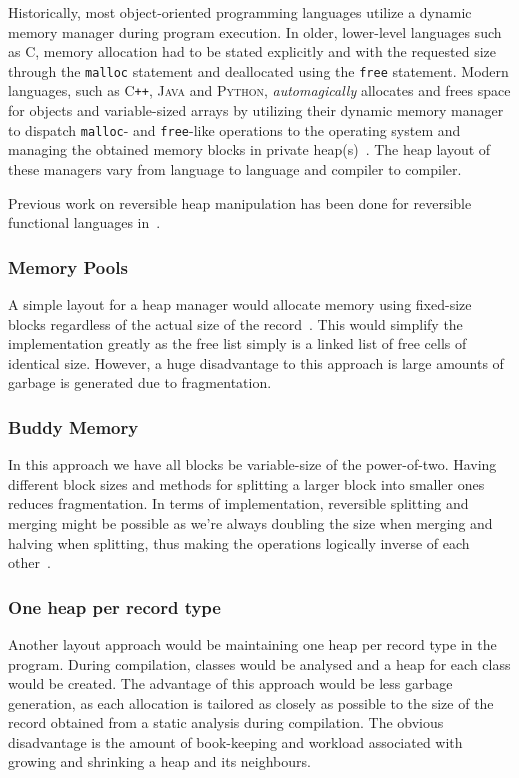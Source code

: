 Historically, most object-oriented programming languages utilize a dynamic memory manager during program execution. In older, lower-level languages such as \textsc{C}, memory allocation had to be stated explicitly and with the requested size through the \texttt{malloc} statement and deallocated using the \texttt{free} statement. Modern languages, such as \textsc{C\texttt{++}}, \textsc{Java} and \textsc{Python}, \textit{automagically} allocates and frees space for objects and variable-sized arrays by utilizing their dynamic memory manager to dispatch \texttt{malloc}- and \texttt{free}-like operations to the operating system and managing the obtained memory blocks in private heap(s)~\cite{wh:cpp_memory, bv:jvm, py:memory}. The heap layout of these managers vary from language to language and compiler to compiler.

Previous work on reversible heap manipulation has been done for reversible functional languages in~\cite{ha:heap, jsk:translation, tm:garbage}.

\subsubsection{Memory Pools}
A simple layout for a heap manager would allocate memory using fixed-size blocks regardless of the actual size of the record~\cite{bk:memorypool}. This would simplify the implementation greatly as the free list simply is a linked list of free cells of identical size. However, a huge disadvantage to this approach is large amounts of garbage is generated due to fragmentation.



\subsubsection{Buddy Memory}
In this approach we have all blocks be variable-size of the power-of-two. Having different block sizes and methods for splitting a larger block into smaller ones reduces fragmentation. In terms of implementation, reversible splitting and merging might be possible as we're always doubling the size when merging and halving when splitting, thus making the operations logically inverse of each other~\cite{dk:buddyalloc}.


\subsubsection{One heap per record type}
Another layout approach would be maintaining one heap per record type in the program. During compilation, classes would be analysed and a heap for each class would be created. The advantage of this approach would be less garbage generation, as each allocation is tailored as closely as possible to the size of the record obtained from a static analysis during compilation. The obvious disadvantage is the amount of book-keeping and workload associated with growing and shrinking a heap and its neighbours.


